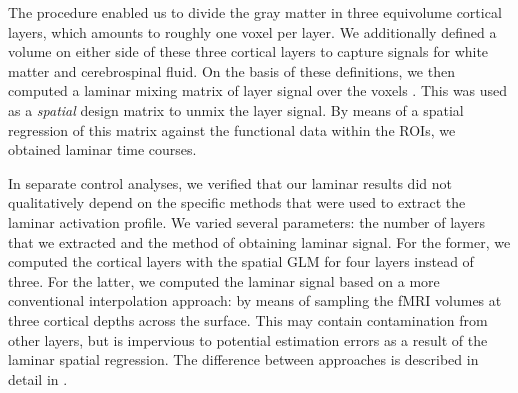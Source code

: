 \documentclass[9pt,lineno]{aperture}
\begin{document}
The procedure enabled us to divide the gray matter in three equivolume cortical layers, which amounts to roughly one voxel per layer. We additionally defined a volume on either side of these three cortical layers to capture signals for white matter and cerebrospinal fluid. On the basis of these definitions, we then computed a laminar mixing matrix of layer signal over the voxels \citep{VanMourik2018}. This was used as a \emph{spatial} design matrix to unmix the layer signal. By means of a spatial regression of this matrix against the functional data within the ROIs, we obtained laminar time courses.

In separate control analyses, we verified that our laminar results did not qualitatively depend on the specific methods that were used to extract the laminar activation profile. We varied several parameters: the number of layers that we extracted and the method of obtaining laminar signal. For the former, we computed the cortical layers with the spatial GLM for four layers instead of three. For the latter, we computed the laminar signal based on a more conventional interpolation approach: by means of sampling the fMRI volumes at three cortical depths across the surface. This may contain contamination from other layers, but is impervious to potential estimation errors as a result of the laminar spatial regression. The difference between approaches is described in detail in \citet{VanMourik2018}.
\end{document}
